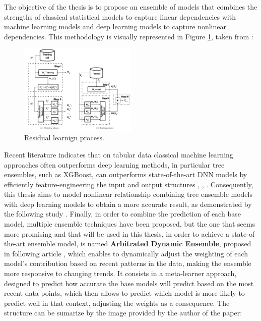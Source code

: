 The objective of the thesis is to propose an ensemble of models that combines the strengths of classical statistical models to capture linear dependencies with machine learning models and deep learning models to capture nonlinear dependencies. This methodology is visually represented in Figure \ref{fig: Residual learning}, taken from \cite{SANTOSJUNIOR2023119614}:
\begin{figure}[H]
    \centering
    \includegraphics[width=0.50\textwidth]{Machine_learning_thesis/Images/residual learning.png}
    \caption{Residual learnign process.} 
    \label{fig: Residual learning}
\end{figure} 
Recent literature indicates that on tabular data classical machine learning approaches often outperforms deep learning methods, in particular tree ensembles, such as XGBoost, can outperforms state-of-the-art DNN models by efficiently feature-engineering the input and output structures \cite{elsayed2021do}, \cite{grinsztajn2022why}, \cite{shwartz2022tabular}. Consequently, this thesis aims to model nonlinear relationship combining tree ensemble models with deep learning models to obtain a more accurate result, as demonstrated by the following study \cite {shwartz2022tabular}. Finally, in order to combine the prediction of each base model, multiple ensemble techniques have been proposed, but the one that seems more promising and that will be used in this thesis, in order to achieve a state-of-the-art ensemble model, is named \textbf{Arbitrated Dynamic Ensemble}, proposed in following article \cite{castro2023arbitrated}, which enables to dynamically adjust the weighting of each model’s contribution based on recent patterns in the data, making the ensemble more responsive to changing trends. It consists in a meta-learner approach, designed to predict how accurate the base models will predict based on the most recent data points, which then allows to predict which model is more likely to predict well in that context, adjusting the weights as a consequence. The structure can be sumarize by the image provided by the author of the paper: 
